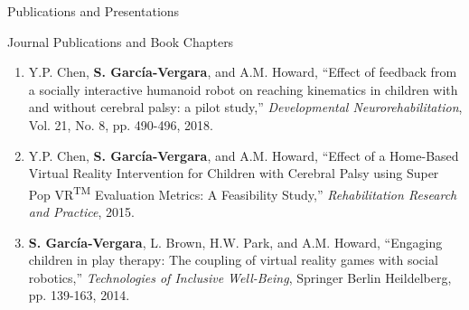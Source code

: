\documentclass{resume} %
\newcommand{\sectionspace}{\vspace{3mm}}
\newcommand{\Sergio}{\textbf{S. Garc\'{i}a-Vergara}}
\newcommand{\SuperPop}{Super Pop VR\textsuperscript{TM}\space}
\newcommand{\fixme}{\textcolor{red}{\textbf{fix me}} \space}
\newcommand{\attention}[1]{\noindent \fixme \textcolor{red}{#1}}
\begin{document}
\sectionspace
\begin{rSection}{Publications and Presentations}

\iffalse
\begin{rSubsection}{In Preparation}{}{}{}
\item
\begin{enumerate}

\item \Sergio, Y.P. Chen, and A.M. Howard, ``Instance- versus Individual-based
  Upper-body Movement Classification for Ground Truth Movement Baseline
  Selection,'' \attention{where to publish?}

\item \Sergio, Y.P. Chen, and A.M. Howard, ``Algorithms for computing
  upper-extremity reaching kinematics,'' \textit{IEEE Transactions on Neural
    Systems and Rehabilitation Engineering}, 2017.

\end{enumerate}
\end{rSubsection}
\fi



\sectionspace
\begin{rSubsection}{Journal Publications and Book Chapters}{}{}{}
\item
\begin{enumerate}

\item Y.P. Chen, \Sergio, and A.M. Howard, ``Effect of feedback from a socially
  interactive humanoid robot on reaching kinematics in children with and without
  cerebral palsy: a pilot study,'' \textit{Developmental Neurorehabilitation},
  Vol. 21, No. 8, pp. 490-496, 2018.

\item Y.P. Chen, \Sergio, and A.M. Howard, ``Effect of a Home-Based Virtual
  Reality Intervention for Children with Cerebral Palsy using \SuperPop
  Evaluation Metrics: A Feasibility Study,'' \textit{Rehabilitation Research and
    Practice}, 2015.

\item \Sergio, L. Brown, H.W. Park, and A.M. Howard, ``Engaging children in play
  therapy: The coupling of virtual reality games with social robotics,''
  \textit{Technologies of Inclusive Well-Being}, Springer Berlin Heildelberg,
  pp. 139-163, 2014.
\end{enumerate}
\end{rSubsection}




\end{rSection}
\end{document}
